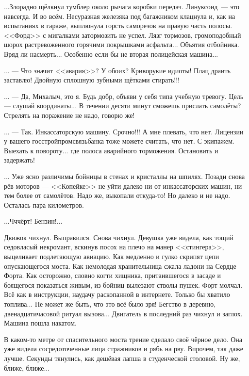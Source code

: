 \emptypar

...Злорадно щёлкнул тумблер около рычага коробки передач. Линуксоид~--- это навсегда. И во всём.
Несуразная железяка под багажником клацнула и, как на испытаниях в гараже, выплюнула горсть саморезов на правую часть полосы.
<<Форд>> с мигалками затормозить не успел. Лязг тормозов, громоподобный шорох растревоженного горячими покрышками асфальта...
Объятия отбойника. Вряд ли насмерть... Особенно если бы не вторая полицейская машина...

\emptypar

... --- Что значит <<авария>>? У обоих? Криворукие идиоты! Плац драить заставлю! Двойную сплошную зубными щётками стирать!!!

... --- Да, Михалыч, это я. Будь добр, объяви у себя типа учебную тревогу. Цель --- слушай координаты...
В течении десяти минут сможешь прислать самолёты? Стрелять на поражение не надо, говорю же!

... --- Так. Инкассаторскую машину. Срочно!!! А мне плевать, что нет.
Лицензии у вашего госстройпромсвязьбанка тоже можете считать, что нет.
С экипажем. Выехать к повороту... где полоса аварийного торможения. Остановить и задержать!

\emptypar

... Уже ясно различимы бойницы в стенах и кристаллы на шпилях.
Позади снова рёв моторов --- <<Копейке>> не уйти далеко ни от инкассаторских машин, ни тем более от самолётов.
Надо же, выкопали откуда-то! Но далеко и не надо. Осталась пара километров.

\emptypar

...Чччёрт! Бензин!...

\emptypar

Движок чихнул. Выправился. Снова чихнул. Девушка уже видела, как тощий седовласый некромант,
вскинув посох на плечо на манер <<стингера>>, выцеливает подлетающую авиацию.
Как медленно и гулко скрипят цепи опускающегося моста. Как немолодая хранительница сжала ладони на Сердце Форта.
Как осторожно, словно когти хищника, притаившегося в засаде и боящегося показаться живым, из бойниц вылезают стволы пушек.
Форт молчал. Всё как в инструкции, наудачу раскопанной в интернете. Только бы хватило топлива...
Не может же быть, что это всё было зря! Бегство в деревню, двенадцатичасовой ритуал вызова...
Двигатель в последний раз чихнул и заглох. Машина пошла накатом.

\emptypar

В каком-то метре от спасительного моста трение сделало своё чёрное дело.
Она уже видела сосредоточенные лица стражников и рябь на рву.
Впрочем, так даже лучше. Секунды тянулись, как дешёвая лапша в студенческой столовой. Ну же, ближе, ближе...


